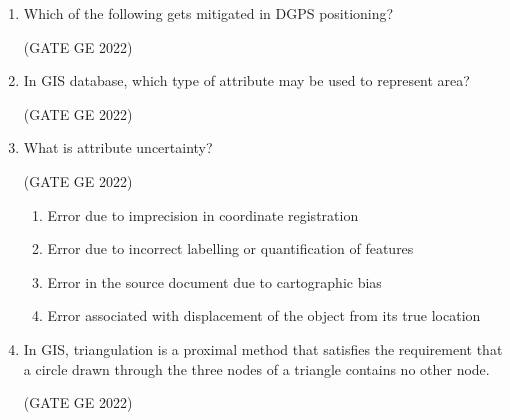 \documentclass[journal,12pt,onecolumn]{IEEEtran}
\theoremstyle{remark}
\begin{document}
\begin{enumerate}
\item Which of the following gets mitigated in DGPS positioning?

\hfill (GATE GE 2022)

\begin{enumerate}
\end{enumerate}

\item In GIS database, which type of attribute may be used to represent area?

\hfill (GATE GE 2022)

\begin{enumerate}
\end{enumerate}

\item What is attribute uncertainty?

\hfill (GATE GE 2022)

\begin{enumerate}
    \item Error due to imprecision in coordinate registration
    \item Error due to incorrect labelling or quantification of features
    \item Error in the source document due to cartographic bias
    \item Error associated with displacement of the object from its true location
\end{enumerate}

\item In GIS, \makebox[2cm]{\hrulefill} triangulation is a proximal method that satisfies the requirement that a circle drawn through the three nodes of a triangle contains no other node.

\hfill (GATE GE 2022)

\begin{enumerate}
\end{enumerate}


\end{enumerate}
\end{document}
